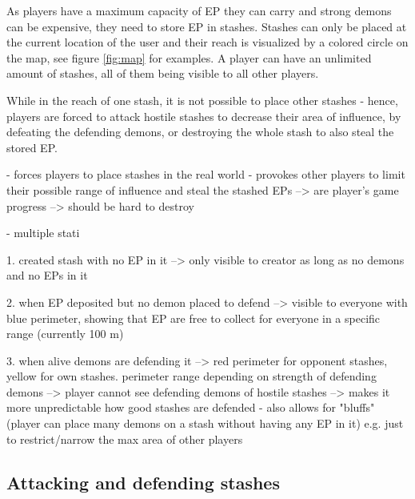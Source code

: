 As players have a maximum capacity of EP they can carry and strong demons can be expensive, they need to store EP in stashes.
Stashes can only be placed at the current location of the user and their reach is visualized by a colored circle on the map, see figure \ref{fig:map} for examples.
A player can have an unlimited amount of stashes, all of them being visible to all other players. 

While in the reach of one stash, it is not possible to place other stashes - hence, players are forced to attack hostile stashes to decrease their area of influence, by defeating the defending demons, or destroying the whole stash to also steal the stored EP.

- forces players to place stashes in the real world 
- provokes other players to limit their possible range of influence and steal the stashed EPs
--> are player's game progress
--> should be hard to destroy

- multiple stati

1. created stash with no EP in it --> only visible to creator as long as no demons and no EPs in it

2. when EP deposited but no demon placed to defend --> visible to everyone with blue perimeter, showing that EP are free to collect for everyone in a specific range (currently 100 m)

3. when alive demons are defending it --> red perimeter for opponent stashes, yellow for own stashes. perimeter range depending on strength of defending demons
--> player cannot see defending demons of hostile stashes --> makes it more unpredictable how good stashes are defended
- also allows for "bluffs" (player can place many demons on a stash without having any EP in it) e.g. just to restrict/narrow the max area of other players


\subsection{Attacking and defending stashes}
\label{subsec:attackingstashes}

